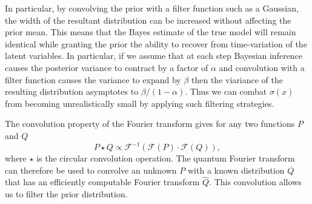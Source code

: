 \documentclass[aps,amsmath,onecolumn,amssymb,notitlepage]{revtex4-1}
\begin{document}
In particular, by convolving the prior with a filter function such as a
Gaussian, the width of the resultant distribution can be increased without
affecting the prior mean.  This means that the Bayes estimate of the true
model will remain identical while granting the prior the ability to recover
from time-variation of the latent variables.  In particular, if we assume
that at each step Bayesian inference causes the posterior variance to contract
by a factor of $\alpha$ and  convolution with a filter function causes the
variance to expand by $\beta$ then the viariance of the resulting distribution
asymptotes to $\beta/(1-\alpha)$. Thus we can combat $\sigma(x)$ from becoming
unrealistically small by applying such filtering strategies.

The convolution property of the Fourier transform gives for any two functions $P$ and $Q$
\begin{equation}
P \star Q \propto \mathcal{F}^{-1}\left(\mathcal{F}(P) \cdot \mathcal{F}(Q) \right),\label{eq:conv}
\end{equation}
where $\star$ is the circular convolution operation.
The quantum Fourier transform can therefore be used to convolve an unknown $P$ with a known distribution $Q$ that has an efficiently computable Fourier transform $\hat{Q}$.  This
convolution allows us to filter the prior distribution.
\end{document}
